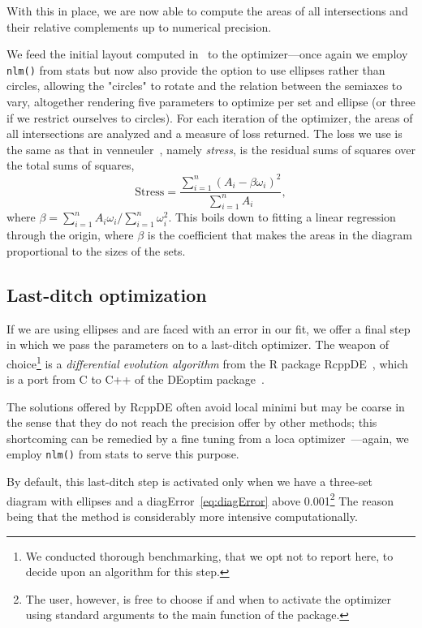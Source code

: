 \documentclass[
  oneside,
  openany,
  numbers=noendperiod,
  parskip=half,
  bibliography=totoc
]{scrbook}\usepackage[]{graphicx}\usepackage{xcolor}
\newcommand{\proglang}[1]{\textsf{#1}}
\newcommand{\pkg}[1]{{\fontseries{b}\selectfont #1}}
\newcommand{\code}[1]{\texttt{#1}}
\begin{document}
With this in place, we are now able to compute the areas of all intersections
and their relative complements up to numerical precision.

We feed the initial
layout computed in~ to the optimizer---once again
we employ \code{nlm()} from \pkg{stats} but now also provide the option to
use ellipses rather than circles, allowing the "circles"
to rotate and the relation between the semiaxes to vary, altogether
rendering five parameters to optimize per set and ellipse (or three if we
restrict ourselves to circles). For each iteration of
the optimizer, the areas of all intersections are analyzed and a measure of loss
returned. The loss we use is the same as that in \pkg{venneuler}~\cite{Wilkinson_2012},
namely \emph{stress}, is the residual sums of squares over the total sums of squares,
\begin{equation}
\text{Stress} = \frac{\sum_{i=1}^n (A_i - \beta \omega_i)^2}{\sum_{i=1}^n A_i},
\label{eq:stress}
\end{equation}
where $\beta = \sum_{i=1}^n A_i\omega_i/\sum_{i=1}^n \omega_i^2$. This boils
down to fitting a linear regression through the origin, where $\beta$ is the
coefficient that makes the areas in the diagram proportional to the
sizes of the sets.

\subsection{Last-ditch optimization}
\label{sec:last-ditch}

If we are using ellipses and are faced with an error in our fit,
we offer a final step in which we
pass the parameters on to a last-ditch optimizer. The weapon of choice\footnote{
We conducted thorough benchmarking, that we opt not to report here, to
decide upon an algorithm for this step.
} is a \emph{differential evolution algorithm}
from the R package \pkg{RcppDE}~\citep{Eddelbuettel_2016}, which is a
port from \proglang{C} to \proglang{C++} of the \pkg{DEoptim}
package~\cite{Mullen_2011}.

The solutions offered by \pkg{RcppDE} often avoid local minimi but may be
coarse in the sense that they do not reach the precision offer by other methods;
this shortcoming can be remedied by a fine tuning from a loca
optimizer~\citep{Xiang_2013}---again, we employ \code{nlm()} from \pkg{stats} to
serve this purpose.

By default, this last-ditch step is activated only when we have a three-set diagram
with ellipses and a diagError~\eqref{eq:diagError} above 0.001\footnote{
The user, however, is free to choose if and when to activate the
optimizer using standard arguments to the main function of the package.} The
reason being that the method is considerably more intensive computationally.
\end{document}
